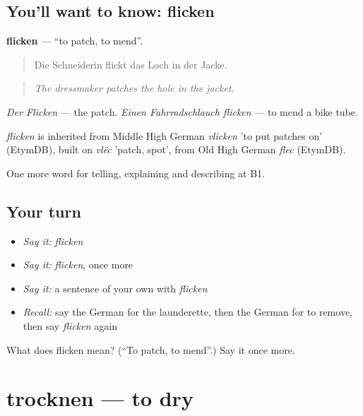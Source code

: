 \subsection*{You'll want to know: flicken}
\textbf{flicken} — \textquotedblleft{}to patch, to mend\textquotedblright{}.

\begin{quote}
Die Schneiderin flickt das Loch in der Jacke.
\end{quote}

\begin{quote}
\emph{The dressmaker patches the hole in the jacket.}
\end{quote}

\emph{Der Flicken} — the patch. \emph{Einen Fahrradschlauch flicken} — to mend a bike tube.

\begin{cousinweb}
\emph{flicken} is inherited from Middle High German \emph{vlicken} 'to put patches on' (EtymDB), built on \emph{vlëc} 'patch, spot', from Old High German \emph{flec} (EtymDB).
\end{cousinweb}

\begin{grammarlens}[title={What you've built}]
One more word for telling, explaining and describing at B1.
\end{grammarlens}

\subsection*{Your turn}
\begin{itemize}
\raggedright
  \item \emph{Say it:} \emph{flicken}
  \item \emph{Say it:} \emph{flicken}, once more
  \item \emph{Say it:} a sentence of your own with \emph{flicken}
  \item \emph{Recall:} say the German for the launderette, then the German for to remove, then say \emph{flicken} again
\end{itemize}

\begin{tcolorbox}[breakable,colback=teal!4,colframe=teal!35!black,title={Before you move on}]
What does flicken mean? (\textquotedblleft{}To patch, to mend\textquotedblright{}.) Say it once more.
\end{tcolorbox}
\section[trocknen]{trocknen — to dry}

